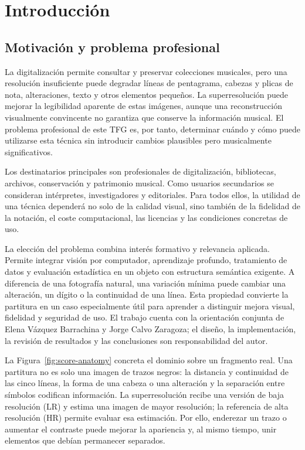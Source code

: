 \chapter{Introducción}

\section{Motivación y problema profesional}
La digitalización permite consultar y preservar colecciones musicales, pero una resolución
insuficiente puede degradar líneas de pentagrama, cabezas y plicas de nota, alteraciones, texto y
otros elementos pequeños. La superresolución puede mejorar la legibilidad aparente de estas
imágenes, aunque una reconstrucción visualmente convincente no garantiza que conserve la
información musical. El problema profesional de este TFG es, por tanto, determinar cuándo y cómo
puede utilizarse esta técnica sin introducir cambios plausibles pero musicalmente significativos.

Los destinatarios principales son profesionales de digitalización, bibliotecas, archivos,
conservación y patrimonio musical. Como usuarios secundarios se consideran intérpretes,
investigadores y editoriales. Para todos ellos, la utilidad de una técnica dependerá no solo de la
calidad visual, sino también de la fidelidad de la notación, el coste computacional, las licencias
y las condiciones concretas de uso.

La elección del problema combina interés formativo y relevancia aplicada. Permite integrar visión
por computador, aprendizaje profundo, tratamiento de datos y evaluación estadística en un objeto
con estructura semántica exigente. A diferencia de una fotografía natural, una variación mínima
puede cambiar una alteración, un dígito o la continuidad de una línea. Esta propiedad convierte la
partitura en un caso especialmente útil para aprender a distinguir mejora visual, fidelidad y
seguridad de uso. El trabajo cuenta con la orientación conjunta de Elena Vázquez Barrachina y
Jorge Calvo Zaragoza; el diseño, la implementación, la revisión de resultados y las conclusiones
son responsabilidad del autor.

La Figura~\ref{fig:score-anatomy} concreta el dominio sobre un fragmento real. Una partitura no es
solo una imagen de trazos negros: la distancia y continuidad de las cinco líneas, la forma de una
cabeza o una alteración y la separación entre símbolos codifican información. La
superresolución recibe una versión de baja resolución (LR) y estima una imagen de mayor resolución;
la referencia de alta resolución (HR) permite evaluar esa estimación. Por ello, enderezar un trazo
o aumentar el contraste puede mejorar la apariencia y, al mismo tiempo, unir elementos que debían
permanecer separados.

